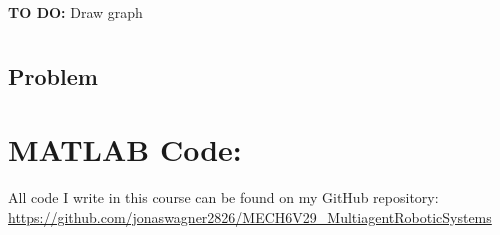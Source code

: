 \documentclass[]{article}
\numberwithin{equation}{section}
\begin{document}









\textbf{TO DO:} 
Draw graph


\newpage
\section{}
\subsection*{Problem}




\newpage
\appendix
\section{MATLAB Code:}\label{apx:matlab}
All code I write in this course can be found on my GitHub repository:\\
\href{https://github.com/jonaswagner2826/MECH6V29_MultiagentRoboticSystems}{https://github.com/jonaswagner2826/MECH6V29\_MultiagentRoboticSystems}




% 

% 

% 

\end{document}
